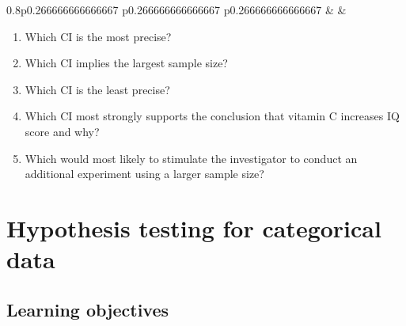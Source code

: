 \documentclass[
]{memoir}
\providecommand{\tightlist}{%
  \setlength{\itemsep}{0pt}\setlength{\parskip}{0pt}}
\begin{document}
\begin{table}[ht]
\begin{centerbox}
\begin{threeparttable}
\begin{tabularx}{0.8\textwidth}{p{} p{} p{}}
 &
 &
 \tabularnewline[-0.5pt]


\end{tabularx}
\end{threeparttable}\par\end{centerbox}

\end{table}
 

\begin{enumerate}
\def\labelenumi{\alph{enumi})}
\tightlist
\item
  Which CI is the most precise?
\item
  Which CI implies the largest sample size?
\item
  Which CI is the least precise?
\item
  Which CI most strongly supports the conclusion that vitamin C increases IQ score and why?
\item
  Which would most likely to stimulate the investigator to conduct an additional experiment using a larger sample size?
\end{enumerate}

\hypertarget{hypothesis-testing-for-categorical-data}{%
\chapter{Hypothesis testing for categorical data}\label{hypothesis-testing-for-categorical-data}}

\hypertarget{learning-objectives-6}{%
\section*{Learning objectives}\label{learning-objectives-6}}
\end{document}
